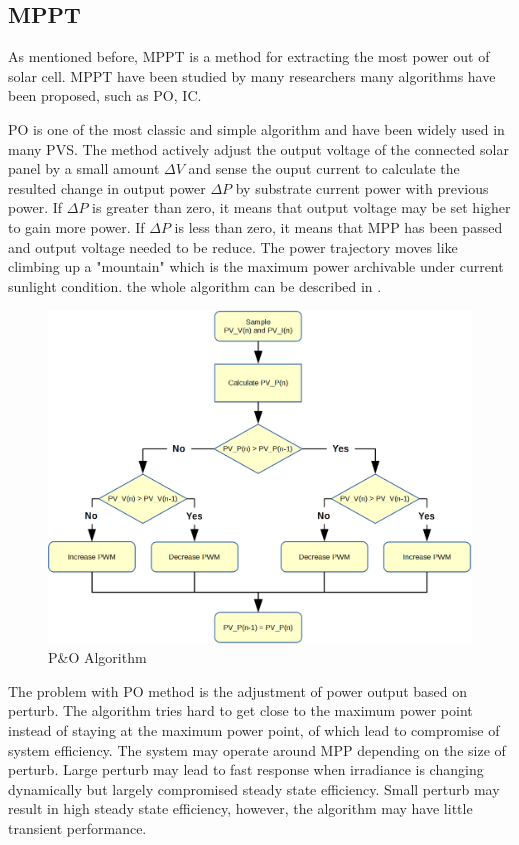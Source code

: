 \subsection{MPPT}
As mentioned before, \gls{MPPT} is a method for extracting the most power out of solar cell. \gls{MPPT} have been studied by many researchers many algorithms have been proposed, such as \gls{PO}, \gls{IC}\cite{RN16}\cite{RN34}\cite{RN28}\cite{RN12}\cite{RN18}. \

\gls{PO} is one of the most classic and simple algorithm and have been widely used in many \gls{PVS}. The method actively adjust the output voltage of the connected solar panel by a small amount $\Delta V$ and sense the ouput current to calculate the resulted change in output power $\Delta P$ by substrate current power with previous power. If $\Delta P$ is greater than zero, it means that output voltage may be set higher to gain more power. If $\Delta P$ is less than zero, it means that MPP has been passed and output voltage needed to be reduce. The power trajectory moves like climbing up a "mountain" which is the maximum power archivable under current sunlight condition. the whole algorithm can be described in .
\begin{figure}[!b]
\centering
    \includegraphics[width = 1\textwidth]{figures/pando.png}
    \caption{P\&O Algorithm}
    \label{fig:hill_climb}	
\end{figure}

The problem with \gls{PO} method is the adjustment of power output based on perturb. The algorithm tries hard to get close to the maximum power point instead of staying at the maximum power point, of which lead to compromise of system efficiency. The system may operate around MPP depending on the size of perturb. Large perturb may lead to fast response when irradiance is changing dynamically but largely compromised steady state efficiency. Small perturb may result in high steady state efficiency, however, the algorithm may have little transient performance. 

